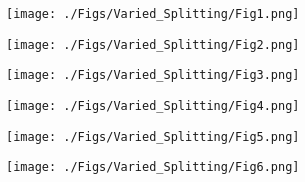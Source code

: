 \documentclass[11pt,reqno]{amsart}
\begin{document}
\begin{figure}[htb!]
\texttt{[image: ./Figs/Varied\_Splitting/Fig1.png]}
\end{figure}
\begin{figure}[htb!]
\texttt{[image: ./Figs/Varied\_Splitting/Fig2.png]}
\end{figure}
\begin{figure}[htb!]
\texttt{[image: ./Figs/Varied\_Splitting/Fig3.png]}
\end{figure}
\begin{figure}[htb!]
\texttt{[image: ./Figs/Varied\_Splitting/Fig4.png]}
\end{figure}
\begin{figure}[htb!]
\texttt{[image: ./Figs/Varied\_Splitting/Fig5.png]}
\end{figure}
\begin{figure}[htb!]
\texttt{[image: ./Figs/Varied\_Splitting/Fig6.png]}
\end{figure}

\newpage
\end{document}
